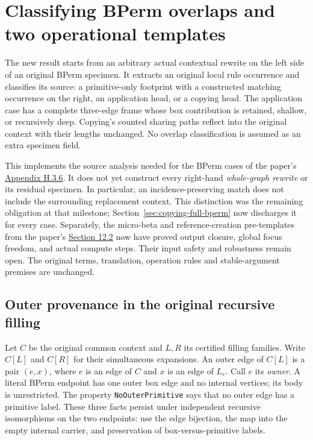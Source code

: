 \clearpage
\section{Classifying BPerm overlaps and two operational templates}
\label{sec:copying-overlap-classification}
The new result starts from an arbitrary actual contextual rewrite on the
left side of an original BPerm specimen. It extracts an original local rule
occurrence and classifies its source: a primitive-only footprint with a
constructed matching occurrence on the right, an application head, or a
copying head. The application case has a complete three-edge frame whose
box contribution is retained, shallow, or recursively deep. Copying's
counted sharing paths reflect into the original context with their lengths
unchanged. No overlap classification is assumed as an extra specimen field.

This implements the source analysis needed for the BPerm cases of the paper's
\href{https://arxiv.org/html/1907.01257v5\#A8.SS3.SSS6}{Appendix H.3.6}.
It does not yet construct every right-hand \emph{whole-graph rewrite} or its
residual specimen. In particular, an incidence-preserving match does not
include the surrounding replacement context. This distinction was the remaining obligation at that milestone;
Section~\ref{sec:copying-full-bperm} now discharges it for every case. Separately, the micro-beta and
reference-creation pre-templates from the paper's
\href{https://arxiv.org/html/1907.01257v5\#S12.SS2}{Section 12.2}
now have proved output closure, global focus freedom, and actual compute
steps. Their input safety and robustness remain open. The original terms,
translation, operation rules and stable-argument premises are unchanged.

\subsection{Outer provenance in the original recursive filling}
Let $C$ be the original common context and $L,R$ its certified filling
families. Write $C[L]$ and $C[R]$ for their simultaneous expansions.
An outer edge of $C[L]$ is a pair $(e,x)$, where $e$ is an edge of $C$ and
$x$ is an edge of $L_e$. Call $e$ its \emph{owner}. A literal BPerm endpoint
has one outer box edge and no internal vertices; its body is unrestricted.
The property \texttt{NoOuterPrimitive} says that no outer edge has a primitive
label. These three facts persist under independent recursive isomorphisms
on the two endpoints: use the edge bijection, the map into the empty
internal carrier, and preservation of box-versus-primitive labels.

